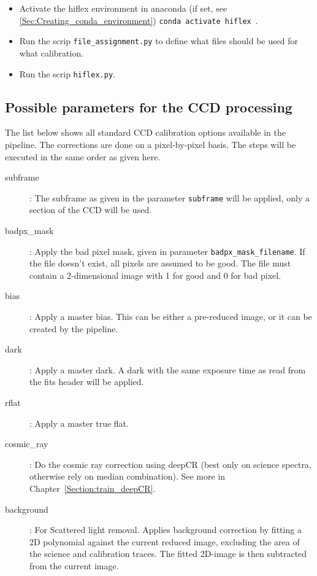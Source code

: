 \documentclass[10pt,a4paper]{article}
\begin{document}
\begin{itemize}
  \item Activate the hiflex environment in anaconda (if set, see \ref{Sec:Creating_conda_environment}) \verb|conda activate hiflex|~.
    
  \item Run the scrip \verb|file_assignment.py| to define what files should be used for what calibration.
    
  \item Run the scrip \verb|hiflex.py|.

\end{itemize}


\subsection{Possible parameters for the CCD processing}
\label{Section:parameters_CCD_proc}
\noindent The list below shows all standard CCD calibration options available in the pipeline. The corrections are done on a pixel-by-pixel basis. The steps will be executed in the same order as given here.
\begin{description}
  \item[subframe] : The subframe as given in the parameter \verb|subframe| will be applied, only a section of the CCD will be used.
  \item[badpx\_mask] : Apply the bad pixel mask, given in parameter \verb|badpx_mask_filename|. If the file doesn't exist, all pixels are assumed to be good. The file must contain a 2-dimensional image with 1 for good and 0 for bad pixel.
  \item[bias] : Apply a master bias. This can be either a pre-reduced image, or it can be created by the pipeline. %
  \item[dark] : Apply a master dark. A dark with the same exposure time as read from the fits header will be applied. %
  \item[rflat] : Apply a master true flat. %
  \item[cosmic\_ray] : Do the cosmic ray correction using deepCR (best only on science spectra, otherwise rely on median combination). See more in Chapter~\ref{Section:train_deepCR}.
  \item[background] : For Scattered light removal. Applies background correction by fitting a 2D polynomial against the current reduced image, excluding the area of the science and calibration traces. The fitted 2D-image is then subtracted from the current image.
\end{description}
\end{document}
